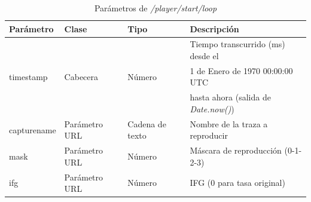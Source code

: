 \begin{table}[H]
\centering
\begin{tabular}{|l|l|l|l|}
\hline
\rowcolor[HTML]{F5F5F5}
\textbf{Parámetro}  & \textbf{Clase} & \textbf{Tipo}   & \textbf{Descripción}                        \\ \hline
                    &                &                 & Tiempo transcurrido (ms) desde el           \\
timestamp           & Cabecera       & Número          & 1 de Enero de 1970 00:00:00 UTC             \\
                    &                &                 & hasta ahora (salida de \textit{Date.now()}) \\ \hline
capturename         & Parámetro URL  & Cadena de texto & Nombre de la \gls{traza} a reproducir       \\ \hline
mask                & Parámetro URL  & Número          & Máscara de reproducción (0-1-2-3)           \\ \hline
ifg                 & Parámetro URL  & Número          & \gls{IFG} (0 para tasa original)            \\ \hline
\end{tabular}
\caption{Parámetros de \textit{/player/start/loop}}
\label{extra:api:playerstartloop:invocacion}
\end{table}

